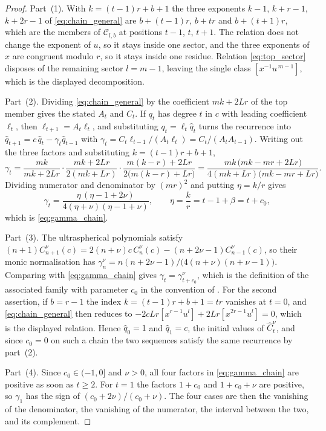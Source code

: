 \documentclass[11pt]{amsart}
\theoremstyle{definition}
\theoremstyle{remark}
\begin{document}
\begin{proof}
Part~(1). With $k=(t-1)r+b+1$ the three exponents $k-1$, $k+r-1$, $k+2r-1$ of
\eqref{eq:chain_general} are $b+(t-1)r$, $b+tr$ and $b+(t+1)r$, which are the
members of $\mathcal C_{l,b}$ at positions $t-1$, $t$, $t+1$. The relation does
not change the exponent of $u$, so it stays inside one sector, and the three
exponents of $x$ are congruent modulo $r$, so it stays inside one residue.
Relation \eqref{eq:top_sector} disposes of the remaining sector $l=m-1$, leaving
the single class $[x^{-1}u^{\,m-1}]$, which is the displayed decomposition.

Part~(2). Dividing \eqref{eq:chain_general} by the coefficient $mk+2Lr$ of the
top member gives the stated $A_t$ and $C_t$. If $q_t$ has degree $t$ in $c$ with
leading coefficient $\ell_t$, then $\ell_{t+1}=A_t\ell_t$, and substituting
$q_t=\ell_t\hat q_t$ turns the recurrence into
$\hat q_{t+1}=c\,\hat q_t-\gamma_t\hat q_{t-1}$ with
$\gamma_t=C_t\ell_{t-1}/(A_t\ell_t)=C_t/(A_tA_{t-1})$. Writing out the three
factors and substituting $k=(t-1)r+b+1$,
\[
  \gamma_t=\frac{mk}{mk+2Lr}\cdot\frac{mk+2Lr}{2(mk+Lr)}
           \cdot\frac{m(k-r)+2Lr}{2\bigl(m(k-r)+Lr\bigr)}
         =\frac{mk\,\bigl(mk-mr+2Lr\bigr)}{4(mk+Lr)\bigl(mk-mr+Lr\bigr)} .
\]
Dividing numerator and denominator by $(mr)^2$ and putting $\eta=k/r$ gives
\[
  \gamma_t=\frac{\eta\,(\eta-1+2\nu)}{4(\eta+\nu)(\eta-1+\nu)},
  \qquad \eta=\frac{k}{r}=t-1+\beta=t+c_0 ,
\]
which is \eqref{eq:gamma_chain}.

Part~(3). The ultraspherical polynomials satisfy
$(n+1)C^{\nu}_{n+1}(c)=2(n+\nu)c\,C^{\nu}_n(c)-(n+2\nu-1)C^{\nu}_{n-1}(c)$,
so their monic normalisation has
$\gamma^{\nu}_n=n(n+2\nu-1)/\bigl(4(n+\nu)(n+\nu-1)\bigr)$.
Comparing with \eqref{eq:gamma_chain} gives $\gamma_t=\gamma^{\nu}_{t+c_0}$,
which is the definition of the associated family with parameter $c_0$ in the
convention of \cite{BustozIsmail1982}. For the second assertion, if $b=r-1$ the
index $k=(t-1)r+b+1=tr$ vanishes at $t=0$, and \eqref{eq:chain_general} then
reduces to $-2cLr[x^{r-1}u^l]+2Lr[x^{2r-1}u^l]=0$, which is the displayed
relation. Hence $\hat q_0=1$ and $\hat q_1=c$, the initial values of
$\hat C^{\nu}_t$, and since $c_0=0$ on such a chain the two sequences satisfy
the same recurrence by part~(2).

Part~(4). Since $c_0\in(-1,0]$ and $\nu>0$, all four factors in
\eqref{eq:gamma_chain} are positive as soon as $t\geq2$. For $t=1$ the factors
$1+c_0$ and $1+c_0+\nu$ are positive, so $\gamma_1$ has the sign of
$(c_0+2\nu)/(c_0+\nu)$. The four cases are then the vanishing of the
denominator, the vanishing of the numerator, the interval between the two, and
its complement.
\end{proof}
\end{document}
